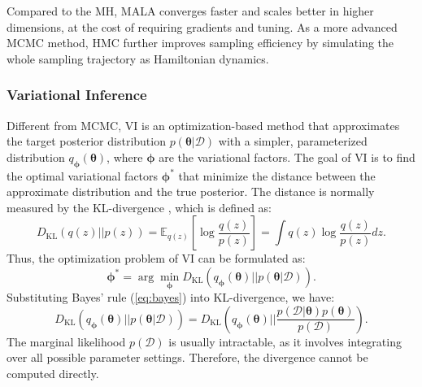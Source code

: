 Compared to the \ac{MH}, \ac{MALA} converges faster and scales better in higher dimensions, at the cost of requiring gradients and tuning. As a more advanced \ac{MCMC} method, \acf{HMC} \citep{duane1987hybrid} further improves sampling efficiency by simulating the whole sampling trajectory as Hamiltonian dynamics. 

\subsubsection{Variational Inference}
Different from \ac{MCMC}, \acf{VI} \citep{Jordan1998, Wainwright2008} is an optimization-based method that approximates the target posterior distribution $p(\boldsymbol{\theta}|\mathcal{D})$ with a simpler, parameterized distribution $q_{\boldsymbol{\phi}}(\boldsymbol{\theta})$, where $\boldsymbol{\phi}$ are the variational factors. The goal of \ac{VI} is to find the optimal variational factors $\boldsymbol{\phi}^*$ that minimize the distance between the approximate distribution and the true posterior. The distance is normally measured by the \ac{KL}-divergence \citep{kl1951}, which is defined as:
\begin{equation}
    D_{\text{KL}}(q(z)||p(z)) = \mathbb{E}_{q(z)}[\log \frac{q(z)}{p(z)}] = \int q(z)\log \frac{q(z)}{p(z)}dz.
\end{equation}
Thus, the optimization problem of \ac{VI} can be formulated as:
\begin{equation}
    \boldsymbol{\phi}^* = \arg\min_{\boldsymbol{\phi}} D_{\text{KL}} (q_{\boldsymbol{\phi}}(\boldsymbol{\theta}) || p(\boldsymbol{\theta}|\mathcal{D})).
\end{equation}
Substituting Bayes' rule (\ref{eq:bayes}) into \ac{KL}-divergence, we have:
\begin{equation}
    D_{\text{KL}} (q_{\boldsymbol{\phi}}(\boldsymbol{\theta}) || p(\boldsymbol{\theta}|\mathcal{D})) = D_{\text{KL}} (q_{\boldsymbol{\phi}}(\boldsymbol{\theta}) || \frac{p(\mathcal{D}|\boldsymbol{\theta})p(\boldsymbol{\theta})}{p(\mathcal{D})}).
\end{equation}
The marginal likelihood $p(\mathcal{D})$ is usually intractable, as it involves integrating over all possible parameter settings. Therefore, the divergence cannot be computed directly.

